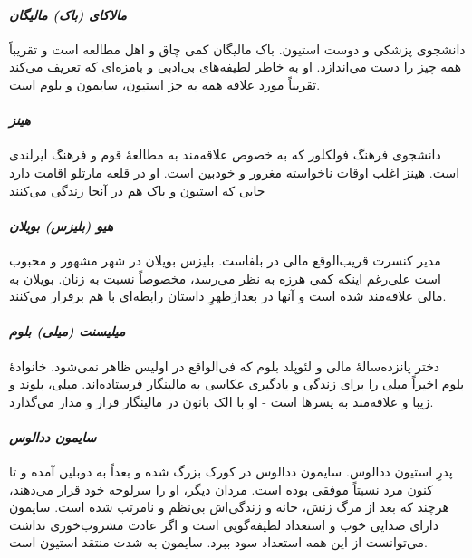 \documentclass[12pt]{book}
\newcommand{\noun}[1]{\textit{\textcolor{black!70}{#1}}}
\begin{document}
    \paragraph{\noun{مالاکای (باک)  مالیگان}\protect{}}
    دانشجوی پزشکی و دوست استیون. باک مالیگان کمی چاق و اهل مطالعه است و تقریباً همه چیز را دست می‌اندازد. او به خاطر لطیفه‌های بی‌ادبی و بامزه‌ای که تعریف می‌کند تقریباً مورد علاقه همه به جز استیون، سایمون و بلوم است.
    \paragraph{\noun{هینز}\protect{}}
    دانشجوی فرهنگ فولکلور که به خصوص علاقه‌مند به مطالعۀ قوم و فرهنگ ایرلندی است. هینز اغلب اوقات ناخواسته مغرور و خودبین است. او در قلعه مارتلو اقامت دارد جایی که استیون و باک هم در آنجا زندگی می‌کنند
    \paragraph{\noun{هیو (بلیزس) بویلان}\protect{}}
    مدیر کنسرت قریب‌الوقع مالی در بلفاست. بلیزس بویلان در شهر مشهور و محبوب است علی‌رغم اینکه کمی هرزه به نظر می‌رسد، مخصوصاً نسبت به زنان. بویلان به مالی علاقه‌مند شده است و آنها در بعدازظهرِ داستان رابطه‌ای با هم برقرار می‌کنند.
    \paragraph{\noun{میلیسنت (میلی) بلوم}\protect{}}
    دختر پانزده‌سالۀ مالی و لئوپلد بلوم که فی‌الواقع در اولیس ظاهر نمی‌شود. خانوادۀ بلوم اخیراً میلی را برای زندگی و یادگیری عکاسی به مالینگار فرستاده‌اند. میلی، بلوند و زیبا و علاقه‌مند به پسرها است - او با الک بانون در مالینگار قرار و مدار می‌گذارد.
    \paragraph{\noun{سایمون ددالوس}\protect{}}
    پدرِ استیون ددالوس. سایمون ددالوس در کورک بزرگ شده و بعداً به دوبلین آمده و تا کنون مرد نسبتاً موفقی بوده است. مردان دیگر، او را سرلوحه خود قرار می‌دهند، هرچند که بعد از مرگ زنش، خانه و زندگی‌اش بی‌نظم و نامرتب شده است. سایمون دارای صدایی خوب و استعداد لطیفه‌گویی است و اگر عادت مشروب‌خوری نداشت می‌توانست از این همه استعداد سود ببرد. سایمون به شدت منتقد استیون است.
\end{document}
